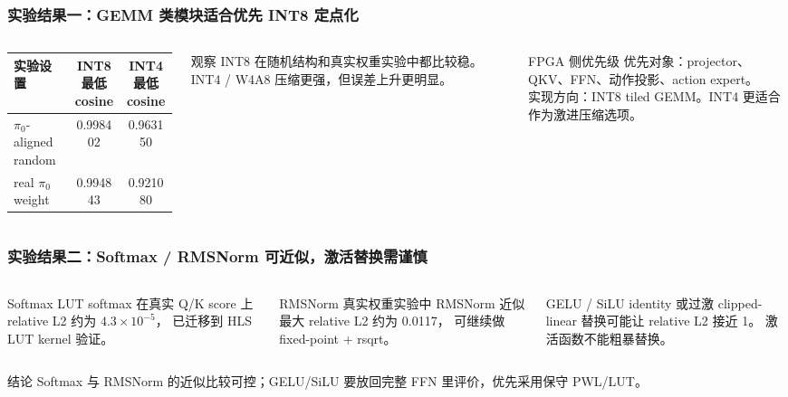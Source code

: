\documentclass[10pt, aspectratio=169]{beamer}
\begin{document}
\begin{frame}
  \frametitle{实验结果一：GEMM 类模块适合优先 INT8 定点化}
  \small
  \begin{columns}[T,onlytextwidth]
    \begin{table}
      \scriptsize
      \setlength{\tabcolsep}{2pt}
      \begin{tabular}{@{}p{0.37\linewidth}cc@{}}
        \toprule
        实验设置                   & INT8 最低 cosine & INT4 最低 cosine \\
        \midrule
        $\pi_0$-aligned random & 0.998402       & 0.963150       \\
        real $\pi_0$ weight    & 0.994843       & 0.921080       \\
        \bottomrule
      \end{tabular}
    \end{table}

    \begin{exampleblock}{观察}
      INT8 在随机结构和真实权重实验中都比较稳。
      INT4 / W4A8 压缩更强，但误差上升更明显。
    \end{exampleblock}

    \begin{alertblock}{FPGA 侧优先级}
      \footnotesize
      优先对象：projector、QKV、FFN、动作投影、action expert。\\
      实现方向：INT8 tiled GEMM。INT4 更适合作为激进压缩选项。
    \end{alertblock}
  \end{columns}
\end{frame}

\begin{frame}
  \frametitle{实验结果二：Softmax / RMSNorm 可近似，激活替换需谨慎}
  \small
  \begin{columns}[T,onlytextwidth]
    \begin{block}{Softmax}
      LUT softmax 在真实 Q/K score 上 relative L2 约为 $4.3\times10^{-5}$，
      已迁移到 HLS LUT kernel 验证。
    \end{block}

    \begin{block}{RMSNorm}
      真实权重实验中 RMSNorm 近似最大 relative L2 约为 0.0117，
      可继续做 fixed-point + rsqrt。
    \end{block}

    \begin{alertblock}{GELU / SiLU}
      identity 或过激 clipped-linear 替换可能让 relative L2 接近 1。
      激活函数不能粗暴替换。
    \end{alertblock}
  \end{columns}

  \vspace{4pt}
  \begin{exampleblock}{结论}
    Softmax 与 RMSNorm 的近似比较可控；GELU/SiLU 要放回完整 FFN 里评价，优先采用保守 PWL/LUT。
  \end{exampleblock}
\end{frame}
\end{document}
